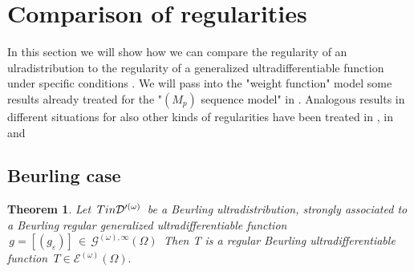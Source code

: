 \documentclass[12pt,a4paper]{amsart}
\newtheorem{theorem}{Theorem}[section]
\begin{document}
  \section{Comparison of regularities}
  
  
  In this section we will show how we can compare the regularity of an ulradistribution to the regularity of a generalized ultradifferentiable function under specific conditions . 
   We will pass into the "weight function" model some results already treated for the "$(M_p)$ sequence model" in \cite{P.R.S.Z}.
 Analogous results in different situations for also other kinds of regularities have been treated in  \cite{P.S.V.1}, in  \cite{P.S.V.2} and \cite{P.S.V.3}
  
  
  \subsection{Beurling case} 
   \begin{theorem}
 Let $\,T \, \\in \mathcal{D}'^{(\omega)}\, $  be a Beurling ultradistribution, strongly associated to a Beurling regular generalized ultradifferentiable function 
 $\,g=[(g_\varepsilon)]\,\in\,
 \mathcal{G}^{(\omega),\infty}(\Omega)\,$
 Then T is a regular Beurling  ultradifferentiable function
 $\,T \in \mathcal{E}^{(\omega)}(\Omega).\,$  
   
   \end{theorem}    
  
\end{document}
